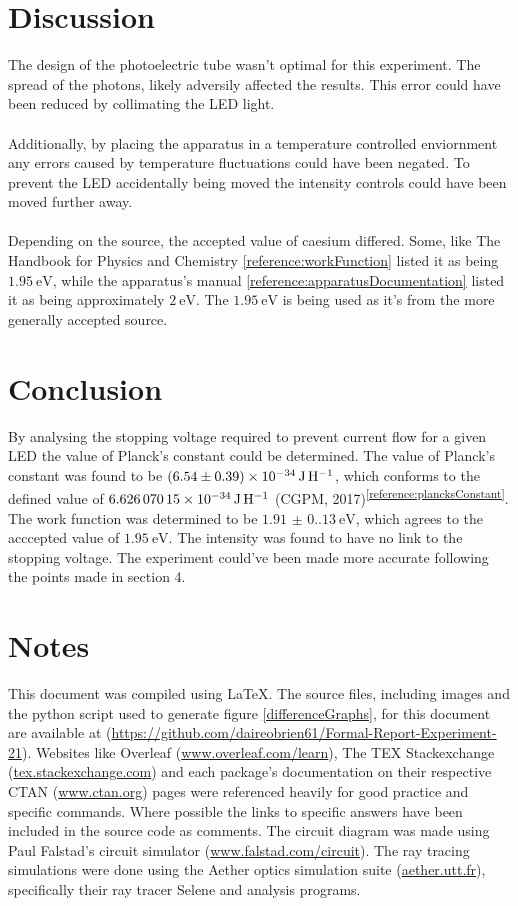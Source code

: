\documentclass{article}[12pt]
\newcommand{\reference}[3]{(#2, #3)\textsuperscript{\ref{#1}}} %
\begin{document}
    \section{Discussion}
        The design of the photoelectric tube wasn't optimal for this experiment. The spread of the photons, likely adversily affected the results. This error could have been reduced by collimating the LED light. \\~\\
        
        Additionally, by placing the apparatus in a temperature controlled enviornment any errors caused by temperature fluctuations could have been negated. To prevent the LED accidentally being moved the intensity controls could have been moved further away. \\~\\

        Depending on the source, the accepted value of caesium differed. Some, like The Handbook for Physics and Chemistry \ref{reference:workFunction} listed it as being $\qty{1.95}{\eV}$, while the apparatus's manual \ref{reference:apparatusDocumentation} listed it as being approximately $\qty{2}{\eV}$. The $\qty{1.95}{\eV}$ is being used as it's from the more generally accepted source.

    \section{Conclusion}
        By analysing the stopping voltage required to prevent current flow for a given LED the value of Planck's constant could be determined. The value of Planck's constant was found to be $\qty{6.54(0.39)E-34}{\J\per\H}$, which conforms to the defined value of $\qty{6.62607015E-34}{\J\per\H}$ \reference{reference:plancksConstant}{CGPM}{2017}. The work function was determined to be $\qty{1.91(0.13)}{\eV}$, which agrees to the acccepted value of $\qty{1.95}{\eV}$. The intensity was found to have no link to the stopping voltage. The experiment could've been made more accurate following the points made in section 4.
        
    \section*{Notes}
        This document was compiled using \LaTeX. The source files, including images and the python script used to generate figure \ref{differenceGraphs}, for this document are available at (\underline{https://github.com/daireobrien61/Formal-Report-Experiment-21}). Websites like Overleaf (\underline{www.overleaf.com/learn}), The TEX Stackexchange (\underline{tex.stackexchange.com}) and each package's documentation on their respective CTAN (\underline{www.ctan.org}) pages were referenced heavily for good practice and specific commands. Where possible the links to specific answers have been included in the source code as comments. The circuit diagram was made using Paul Falstad's circuit simulator (\underline{www.falstad.com/circuit}). The ray tracing simulations were done using the Aether optics simulation suite (\underline{aether.utt.fr}), specifically their ray tracer Selene and analysis programs.
\end{document}
